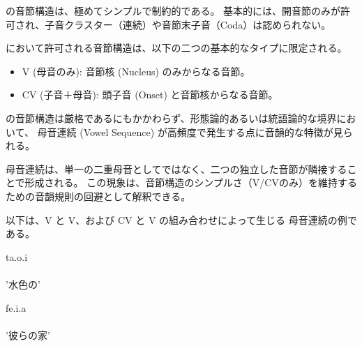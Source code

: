 \langname の音節構造は、{極めてシンプルで制約的}である。
基本的には、開音節のみが許可され、子音クラスター（連続）や音節末子音（Coda）は認められない。

\langname において許可される音節構造は、以下の二つの基本的なタイプに限定される。

\begin{itemize}
    \item {V (母音のみ)}: 音節核 (Nucleus) のみからなる音節。
    \item {CV (子音＋母音)}: 頭子音 (Onset) と音節核からなる音節。
\end{itemize}

\langname の音節構造は厳格であるにもかかわらず、形態論的あるいは統語論的な境界において、
{母音連続 (Vowel Sequence)} が高頻度で発生する点に音韻的な特徴が見られる。

母音連続は、単一の二重母音としてではなく、二つの独立した音節が隣接することで形成される。
この現象は、音節構造のシンプルさ（V/CVのみ）を維持するための音韻規則の回避として解釈できる。

以下は、{V} と {V}、および {CV} と {V} の組み合わせによって生じる
母音連続の例である。

\begin{exe}
    \ex \gll ta.o.i \\ %
    \\
        \glt '水色の'
\end{exe}
\begin{exe}
    \ex \gll fe.i.a \\ %
    \\
        \glt '彼らの家'
\end{exe}
